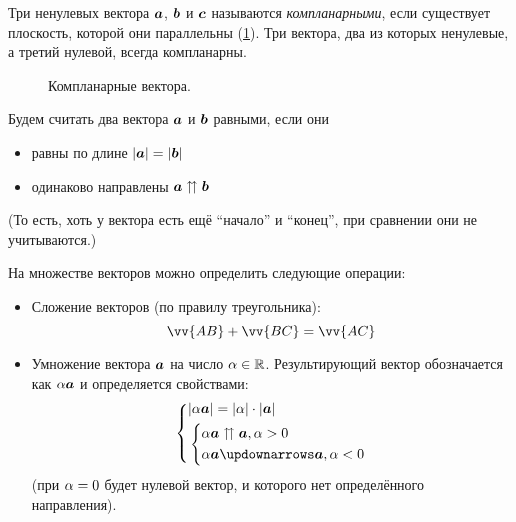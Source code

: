 \documentclass[a4paper,12pt]{article}
\begin{document}
  \begin{definition}[Компланарность]
    Три ненулевых вектора $\boldsymbol a$, $\boldsymbol b$ и $\boldsymbol c$ называются \emph{компланарными}, если существует плоскость, которой они параллельны (\ref{fig:coplanarity}).
    Три вектора, два из которых ненулевые, а третий нулевой, всегда компланарны.
  \end{definition}
  
  \begin{figure}[h]
    \centering
    
    
    \caption{Компланарные вектора.}
    \label{fig:coplanarity}
  \end{figure}
  
  \begin{definition}
    Будем считать два вектора $\boldsymbol a$ и $\boldsymbol b$ равными, если они
    \begin{itemize}
      \item равны по длине $|\boldsymbol a| = |\boldsymbol b|$
      \item одинаково направлены $\boldsymbol a \upuparrows \boldsymbol b$
    \end{itemize}
    
    (То есть, хоть у вектора есть ещё ``начало'' и ``конец'', при сравнении они не учитываются.)
  \end{definition}
  
  На множестве векторов можно определить следующие операции:
  \begin{itemize}
    \item Сложение векторов (по правилу треугольника):  %
      \[
        \vv{AB} + \vv{BC} = \vv{AC}
      \]
    \item Умножение вектора $\boldsymbol a$ на число $\alpha \in \operatorname{\mathbb R}$.
      Результирующий вектор обозначается как $\alpha \boldsymbol a$ и определяется свойствами:
      \[
        \left\{
          \begin{aligned}
            &|\alpha \bds a| = |\alpha| \cdot |\bds a|\\
            &\left\{
               \begin{aligned}
                 &\alpha \bds a \upuparrows \bds a, \alpha > 0\\
                 &\alpha \bds a \updownarrows \bds a, \alpha < 0
               \end{aligned}
             \right.
          \end{aligned}
        \right.
      \]
      (при $\alpha \hm= 0$ будет нулевой вектор, и которого нет определённого направления).
  \end{itemize}
  
\end{document}
